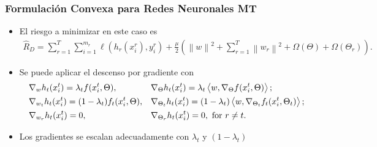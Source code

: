 \documentclass[aspectratio=43]{beamer}
\newcommand{\norm}[1]{\left\lVert#1\right\rVert}
\newcommand{\dotp}[2]{\bm{\left\langle} #1, #2 \bm{\right\rangle}}
\newcommand{\ntasks}{T}
\newcommand{\lossf}{\ell}
\newcommand{\sample}{D}
\newcommand{\risk}{R}
\newcommand{\emprisk}{\hat{\risk}_{\sample}}
\begin{document}
\begin{frame}
      \frametitle{Formulación Convexa para Redes Neuronales MT}

      \begin{itemize}
            \item El riesgo a minimizar en este caso es
            \begin{equation}
                  \nonumber
                  \begin{aligned}
                      \emprisk = \sum_{r=1}^\ntasks \sum_{i=1}^{m_r} \lossf(h_r(x_i^r), y_i^r) + \frac{\mu}{2} \left( \norm{w}^2 + \sum_{r=1}^\ntasks \norm{w_r}^2 + \Omega(\Theta) + \Omega(\Theta_r)\right) .
                  \end{aligned}
            \end{equation}
            \item Se puede aplicar el descenso por gradiente con
            \begin{equation}\nonumber
                  \begin{aligned}       
                      &\nabla_{w} h_t(x_i^t)  
                      = \lambda_t  f(x_i^t, \Theta) ,
                      &&\nabla_{\Theta} h_t(x_i^t)  
                      = \lambda_t  \dotp{w}{\nabla_\Theta f(x_i^t, \Theta)} ; \\
                      &\nabla_{w_t} h_t(x_i^t)  
                      = (1 - \lambda_t)  f_t(x_i^t, \Theta) ,
                      &&\nabla_{\Theta_t} h_t(x_i^t)  
                      = (1 - \lambda_t)   \dotp{w}{\nabla_{\Theta_t} f_t(x_i^t, \Theta_t)} ; \\
                      &\nabla_{w_r} h_t(x_i^t)  
                      =  0 , 
                      &&\nabla_{\Theta_r} h_t(x_i^t)  
                      =  0 , \text{ for } r \neq t .\\
                  \end{aligned}    
              \end{equation}
            \item Los gradientes se escalan adecuadamente con $\lambda_t$ y $(1 - \lambda_t)$
      \end{itemize}

\end{frame}
\end{document}
